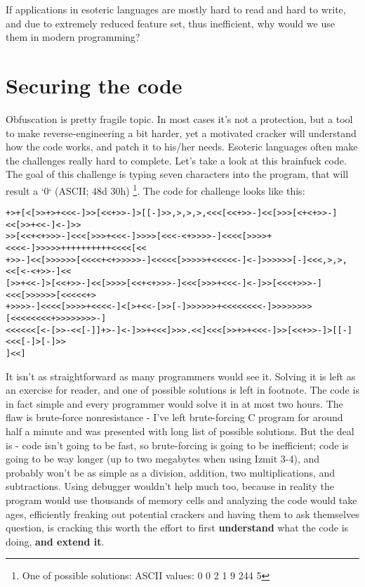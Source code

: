 \documentclass{article}
\begin{document}
\par If applications in esoteric languages are mostly hard to read and hard to write, and due to extremely reduced feature set, thus inefficient, why would we use them in modern programming?

\section{Securing the code}
\par Obfuscation is pretty fragile topic. In most cases it's not a protection, but a tool to make reverse-engineering a bit harder, yet a motivated cracker will understand how the code works, and patch it to his/her needs. Esoteric languages often make the challenges really hard to complete. Let's take a look at this brainfuck code. The goal of this challenge is typing seven characters into the program, that will result a `0` (ASCII; 48d 30h) \footnote{One of possible solutions: ASCII values: 0 0 2 1 9 244 5}. The code for challenge looks like this:

\begin{verbatim}
+>+[<[>>+>+<<<-]>>[<<+>>-]>[[-]>>,>,>,>,<<<[<<+>>-]<<[>>>[<+<+>>-]<<[>>+<<-]<-]>>
>>[<<+<+>>>-]<<<[>>>+<<<-]>>>>[<<<-<+>>>>-]<<<<[>>>>+<<<<-]>>>>>++++++++++<<<<[<<
+>>-]<<[>>>>>>[<<<<+<+>>>>>-]<<<<<[>>>>>+<<<<<-]<-]>>>>>>[-]<<<,>,>,<<[<-<+>>-]<<
[>>+<<-]>[<<+>>-]<<[>>>>[<<+<+>>>-]<<<[>>>+<<<-]<-]>>[<<<+>>>-]<<<[>>>>>>[<<<<<+>
+>>>>-]<<<<[>>>>+<<<<-]<[>+<<-[>>[-]>>>>>>+<<<<<<<<-]>>>>>>>>[<<<<<<<<+>>>>>>>>-]
<<<<<<[<-[>>-<<[-]]+>-]<-]>>+<<<]>>>.<<]<<<[>>+>+<<<-]>>[<<+>>-]>[[-]<<<[-]>[-]>>
]<<]
\end{verbatim}

\par It isn't as straightforward as many programmers would see it. Solving it is left as an exercise for reader, and one of possible solutions is left in footnote. The code is in fact simple and every programmer would solve it in at most two hours. The flaw is brute-force nonresistance - I've left brute-forcing C program for around half a minute and was presented with long list of possible solutions. But the deal is - code isn't going to be fast, so brute-forcing is going to be inefficient; code is going to be way longer (up to two megabytes when using Izmit 3-4), and probably won't be as simple as a division, addition, two multiplications, and subtractions. Using debugger wouldn't help much too, because in reality the program would use thousands of memory cells and analyzing the code would take ages, efficiently freaking out potential crackers and having them to ask themselves question, is cracking this worth the effort to first {\bf understand} what the code is doing, {\bf and extend it}.
\end{document}
